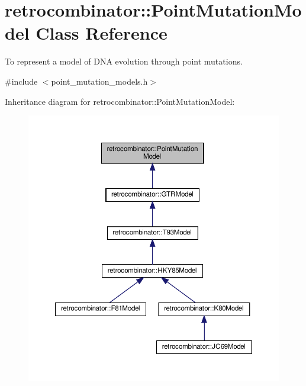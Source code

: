 \hypertarget{classretrocombinator_1_1PointMutationModel}{}\section{retrocombinator\+:\+:Point\+Mutation\+Model Class Reference}
\label{classretrocombinator_1_1PointMutationModel}


To represent a model of D\+NA evolution through point mutations.  




{\ttfamily \#include $<$point\+\_\+mutation\+\_\+models.\+h$>$}



Inheritance diagram for retrocombinator\+:\+:Point\+Mutation\+Model\+:
\nopagebreak
\begin{figure}[H]
\begin{center}
\leavevmode
\includegraphics[width=350pt]{classretrocombinator_1_1PointMutationModel__inherit__graph}
\end{center}
\end{figure}
